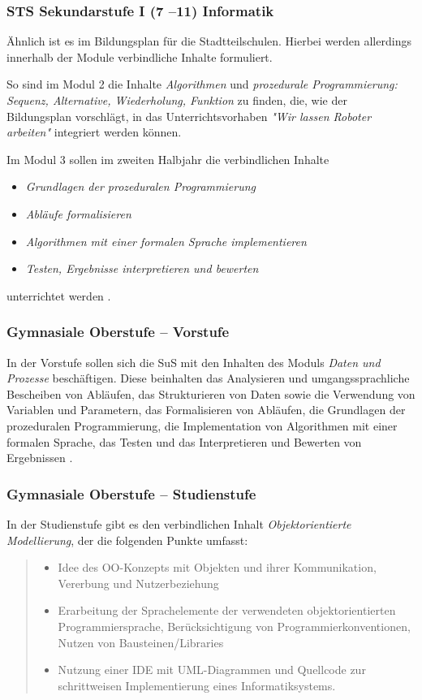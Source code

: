 \documentclass[paper=a4, pagesize, DIV=calc, BCOR=15mm, twoside=on, onecolumn=on, open = right, titlepage =on, parskip =half-, headsepline = on, footsepline = on, chapterprefix = on, appendixprefix = off, fontsize = 12pt, numbers = noenddot, abstract = on]{scrbook}
\numberwithin{equation}{chapter}
\theoremstyle{definition}
\theoremstyle{plain}
\theoremstyle{plain}
\theoremstyle{remark}
\theoremstyle{plain}
\theoremstyle{plain}
\begin{document}
\subsubsection{STS Sekundarstufe I (7 --11) Informatik}
Ähnlich ist es im Bildungsplan für die Stadtteilschulen. Hierbei werden allerdings innerhalb der Module verbindliche Inhalte formuliert.

So sind im Modul 2 die Inhalte \emph{Algorithmen} und \emph{prozedurale Programmierung: Sequenz, Alternative, Wiederholung, Funktion} zu finden, die, wie der Bildungsplan vorschlägt, in das Unterrichtsvorhaben \emph{"Wir lassen Roboter arbeiten"} integriert werden können.

Im Modul 3 sollen im zweiten Halbjahr die verbindlichen Inhalte
\begin{itemize}
\item \emph{Grundlagen der prozeduralen Programmierung}
\item \emph{Abläufe formalisieren}
\item \emph{Algorithmen mit einer formalen Sprache implementieren}
\item \emph{Testen, Ergebnisse interpretieren und bewerten}
\end{itemize}
unterrichtet werden \cite{stsmittel:14}. 


\subsubsection{Gymnasiale Oberstufe -- Vorstufe}

In der Vorstufe sollen sich die SuS mit den Inhalten des Moduls \emph{Daten und Prozesse} beschäftigen. Diese beinhalten das Analysieren und umgangssprachliche Bescheiben von Abläufen, das Strukturieren von Daten sowie die Verwendung von Variablen und Parametern, das Formalisieren von Abläufen, die Grundlagen der prozeduralen Programmierung, die Implementation von Algorithmen mit einer formalen Sprache, das Testen und das Interpretieren und Bewerten von Ergebnissen \cite{oberstufe:09}. 

\subsubsection{Gymnasiale Oberstufe -- Studienstufe}

In der Studienstufe gibt es den verbindlichen Inhalt \emph{Objektorientierte Modellierung}, der die folgenden Punkte umfasst:\\
\begin{quote}
\begin{itemize}
\item Idee des OO-Konzepts mit Objekten und ihrer Kommunikation, Vererbung und Nutzerbeziehung
\item Erarbeitung der Sprachelemente der verwendeten objektorientierten Programmiersprache, Berücksichtigung von Programmierkonventionen, Nutzen von Bausteinen/Libraries
\item Nutzung einer IDE mit UML-Diagrammen und Quellcode zur schrittweisen Implementierung eines Informatiksystems. \qquad \cite{oberstufe:09}
\end{itemize}
\end{quote}
\end{document}
